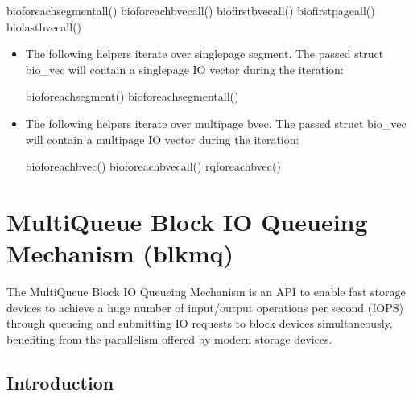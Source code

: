 \documentclass[a4paper,11pt,english]{sphinxmanual}
\begin{document}
\begin{sphinxVerbatim}[commandchars=\\\{\}]
bio\PYGZus{}for\PYGZus{}each\PYGZus{}segment\PYGZus{}all()
bio\PYGZus{}for\PYGZus{}each\PYGZus{}bvec\PYGZus{}all()
bio\PYGZus{}first\PYGZus{}bvec\PYGZus{}all()
bio\PYGZus{}first\PYGZus{}page\PYGZus{}all()
bio\PYGZus{}last\PYGZus{}bvec\PYGZus{}all()
\end{sphinxVerbatim}
\begin{itemize}
\item {} 
The following helpers iterate over single\sphinxhyphen{}page segment. The passed \textquotesingle{}struct
bio\_vec\textquotesingle{} will contain a single\sphinxhyphen{}page IO vector during the iteration:

\begin{sphinxVerbatim}[commandchars=\\\{\}]
bio\PYGZus{}for\PYGZus{}each\PYGZus{}segment()
bio\PYGZus{}for\PYGZus{}each\PYGZus{}segment\PYGZus{}all()
\end{sphinxVerbatim}

\item {} 
The following helpers iterate over multi\sphinxhyphen{}page bvec. The passed \textquotesingle{}struct
bio\_vec\textquotesingle{} will contain a multi\sphinxhyphen{}page IO vector during the iteration:

\begin{sphinxVerbatim}[commandchars=\\\{\}]
bio\PYGZus{}for\PYGZus{}each\PYGZus{}bvec()
bio\PYGZus{}for\PYGZus{}each\PYGZus{}bvec\PYGZus{}all()
rq\PYGZus{}for\PYGZus{}each\PYGZus{}bvec()
\end{sphinxVerbatim}

\end{itemize}


\chapter{Multi\sphinxhyphen{}Queue Block IO Queueing Mechanism (blk\sphinxhyphen{}mq)}
\label{\detokenize{blk-mq:multi-queue-block-io-queueing-mechanism-blk-mq}}\label{\detokenize{blk-mq::doc}}
The Multi\sphinxhyphen{}Queue Block IO Queueing Mechanism is an API to enable fast storage
devices to achieve a huge number of input/output operations per second (IOPS)
through queueing and submitting IO requests to block devices simultaneously,
benefiting from the parallelism offered by modern storage devices.


\section{Introduction}
\label{\detokenize{blk-mq:introduction}}
\end{document}
